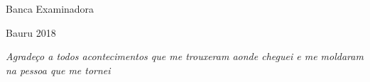 \documentclass[
	12pt,				%
	openright,			%
	oneside,			%
	a4paper,			%
	english,			%
	french,				%
	spanish,			%
	brazil				%
	]{abntex2}
\begin{document}

%
% 
%
\begin{folhadeaprovacao}

  \begin{center}
    {\ABNTEXchapterfont\large\imprimirautor}

    \vspace*{\fill}\vspace*{\fill}
    \begin{center}
      \ABNTEXchapterfont\bfseries\Large\imprimirtitulo
    \end{center}
    \vspace*{\fill}

    \hspace{.45\textwidth}
    \begin{minipage}{.5\textwidth}
        \imprimirpreambulo
    \end{minipage}%
    \vspace*{\fill}
   \end{center}

   \center Banca Examinadora


   \begin{center}
    \vspace*{0.5cm}
    \par
    {Bauru}
    {2018}
    \vspace*{1cm}
  \end{center}

\end{folhadeaprovacao}

\begin{dedicatoria}
   \vspace*{\fill}
   \centering
   \noindent
   \textit{Agradeço a todos acontecimentos que me trouxeram aonde cheguei e me moldaram na pessoa que me tornei} \vspace*{\fill}
\end{dedicatoria}
\end{document}
